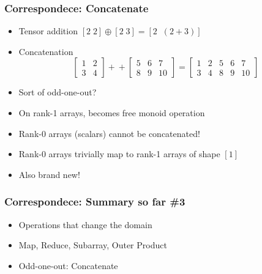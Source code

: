 \documentclass[xetex,mathserif,serif]{beamer}
\begin{document}
\begin{frame}
  \frametitle{Correspondece: Concatenate}
  \begin{itemize}%
    \item Tensor addition \([2\;2] \oplus [2\;3] = [2\;\;(2+3)]\)
    \item Concatenation
      \[
        \begin{bmatrix} 1 & 2 \\ 3 & 4 \end{bmatrix} +\!\!\!+
        \begin{bmatrix} 5 & 6 & 7 \\ 8 & 9 & 10 \end{bmatrix}
        = \begin{bmatrix}
          1 & 2 & 5 & 6 & 7 \\
          3 & 4 & 8 & 9 & 10
        \end{bmatrix}
      \]
    \item Sort of odd-one-out?
    \item On rank-1 arrays, becomes free monoid operation
    \item Rank-0 arrays (scalars) cannot be concatenated!
    \item Rank-0 arrays trivially map to rank-1 arrays of shape \([1]\)
    \item Also brand new!
  \end{itemize}
\end{frame}

\begin{frame}
  \frametitle{Correspondece: Summary so far \#3}
  \begin{itemize}%
    \item Operations that change the domain
    \item Map, Reduce, Subarray, Outer Product
    \item Odd-one-out: Concatenate
  \end{itemize}
\end{frame}
\end{document}
